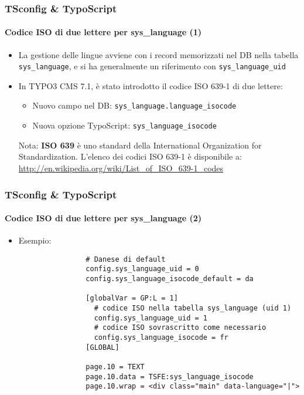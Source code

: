 \begin{frame}[fragile]
	\frametitle{TSconfig \& TypoScript}
	\framesubtitle{Codice ISO di due lettere per sys\_language (1)}

	\begin{itemize}
		\item La gestione delle lingue avviene con i record memorizzati nel DB nella tabella
			\texttt{sys\_language}, e si ha generalmente un riferimento con \texttt{sys\_language\_uid}
		\item In TYPO3 CMS 7.1, è stato introdotto il codice ISO 639-1 di due lettere:

			\begin{itemize}
				\item Nuovo campo nel DB: \texttt{sys\_language.language\_isocode}
				\item Nuova opzione TypoScript: \texttt{sys\_language\_isocode}
			\end{itemize}


		\vspace{1cm}

		\small
			Nota: \textbf{ISO 639} è uno standard della International Organization
			for Standardization. L'elenco dei codici ISO 639-1 è disponibile a:\newline
			\url{http://en.wikipedia.org/wiki/List_of_ISO_639-1_codes}
		\normalsize

	\end{itemize}

\end{frame}


\begin{frame}[fragile]
	\frametitle{TSconfig \& TypoScript}
	\framesubtitle{Codice ISO di due lettere per sys\_language (2)}

	\begin{itemize}
		\item Esempio:

			\begin{lstlisting}
				# Danese di default
				config.sys_language_uid = 0
				config.sys_language_isocode_default = da

				[globalVar = GP:L = 1]
				  # codice ISO nella tabella sys_language (uid 1)
				  config.sys_language_uid = 1
				  # codice ISO sovrascritto come necessario
				  config.sys_language_isocode = fr
				[GLOBAL]

				page.10 = TEXT
				page.10.data = TSFE:sys_language_isocode
				page.10.wrap = <div class="main" data-language="|">
			\end{lstlisting}

	\end{itemize}

\end{frame}

